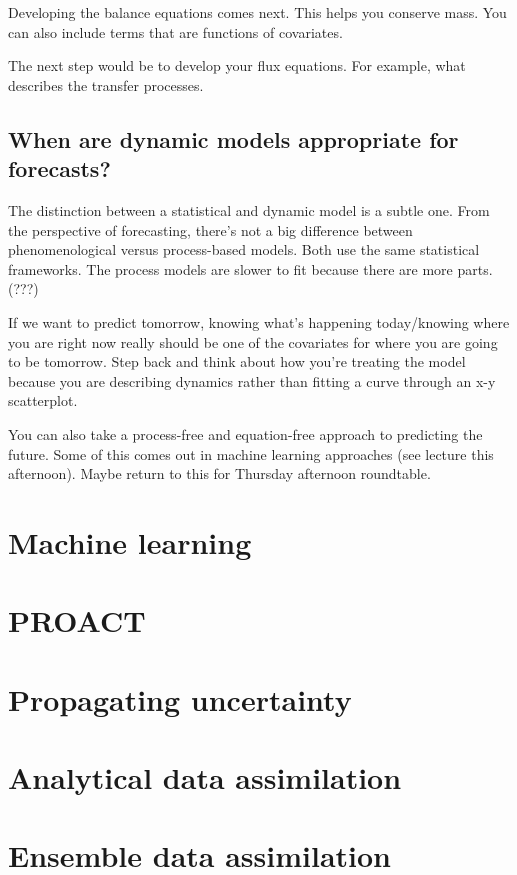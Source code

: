 \documentclass[12pt, oneside]{article}   	%
\begin{document}
Developing the balance equations comes next. This helps you conserve mass. You can also include terms that are functions of covariates.

The next step would be to develop your flux equations. For example, what describes the transfer processes.

\subsection{When are dynamic models appropriate for forecasts?}

The distinction between a statistical and dynamic model is a subtle one. From the perspective of forecasting, there's not a big difference between phenomenological versus process-based models. Both use the same statistical frameworks. The process models are slower to fit because there are more parts. (???)

If we want to predict tomorrow, knowing what's happening today/knowing where you are right now really should be one of the covariates for where you are going to be tomorrow. Step back and think about how you're treating the model because you are describing dynamics rather than fitting a curve through an x-y scatterplot.

You can also take a process-free and equation-free approach to predicting the future. Some of this comes out in machine learning approaches (see lecture this afternoon). Maybe return to this for Thursday afternoon roundtable. 

\section{Machine learning}

\section{PROACT}

\section{Propagating uncertainty}

\section{Analytical data assimilation}

\section{Ensemble data assimilation}
\end{document}
